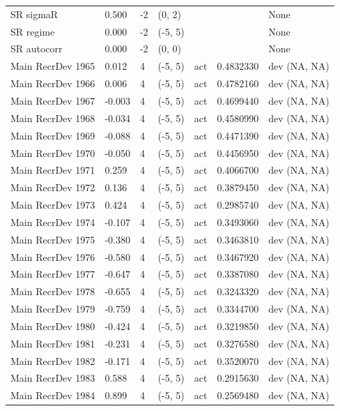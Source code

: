 \documentclass[11pt,
  english,
]{article}
\begin{document}
\begin{landscape}
\begin{longtable}[t]{lllllll}
SR sigmaR & 0.500 & -2 & (0, 2) &  &  & None\\
\addlinespace
SR regime & 0.000 & -2 & (-5, 5) &  &  & None\\
SR autocorr & 0.000 & -2 & (0, 0) &  &  & None\\
Main RecrDev 1965 & 0.012 & 4 & (-5, 5) & act & 0.4832330 & dev (NA, NA)\\
Main RecrDev 1966 & 0.006 & 4 & (-5, 5) & act & 0.4782160 & dev (NA, NA)\\
Main RecrDev 1967 & -0.003 & 4 & (-5, 5) & act & 0.4699440 & dev (NA, NA)\\
\addlinespace
Main RecrDev 1968 & -0.034 & 4 & (-5, 5) & act & 0.4580990 & dev (NA, NA)\\
Main RecrDev 1969 & -0.088 & 4 & (-5, 5) & act & 0.4471390 & dev (NA, NA)\\
Main RecrDev 1970 & -0.050 & 4 & (-5, 5) & act & 0.4456950 & dev (NA, NA)\\
Main RecrDev 1971 & 0.259 & 4 & (-5, 5) & act & 0.4066700 & dev (NA, NA)\\
Main RecrDev 1972 & 0.136 & 4 & (-5, 5) & act & 0.3879450 & dev (NA, NA)\\
\addlinespace
Main RecrDev 1973 & 0.424 & 4 & (-5, 5) & act & 0.2985740 & dev (NA, NA)\\
Main RecrDev 1974 & -0.107 & 4 & (-5, 5) & act & 0.3493060 & dev (NA, NA)\\
Main RecrDev 1975 & -0.380 & 4 & (-5, 5) & act & 0.3463810 & dev (NA, NA)\\
Main RecrDev 1976 & -0.580 & 4 & (-5, 5) & act & 0.3467920 & dev (NA, NA)\\
Main RecrDev 1977 & -0.647 & 4 & (-5, 5) & act & 0.3387080 & dev (NA, NA)\\
\addlinespace
Main RecrDev 1978 & -0.655 & 4 & (-5, 5) & act & 0.3243320 & dev (NA, NA)\\
Main RecrDev 1979 & -0.759 & 4 & (-5, 5) & act & 0.3344700 & dev (NA, NA)\\
Main RecrDev 1980 & -0.424 & 4 & (-5, 5) & act & 0.3219850 & dev (NA, NA)\\
Main RecrDev 1981 & -0.231 & 4 & (-5, 5) & act & 0.3276580 & dev (NA, NA)\\
Main RecrDev 1982 & -0.171 & 4 & (-5, 5) & act & 0.3520070 & dev (NA, NA)\\
\addlinespace
Main RecrDev 1983 & 0.588 & 4 & (-5, 5) & act & 0.2915630 & dev (NA, NA)\\
Main RecrDev 1984 & 0.899 & 4 & (-5, 5) & act & 0.2569480 & dev (NA, NA)\\

\end{longtable}
\end{landscape}
\end{document}
